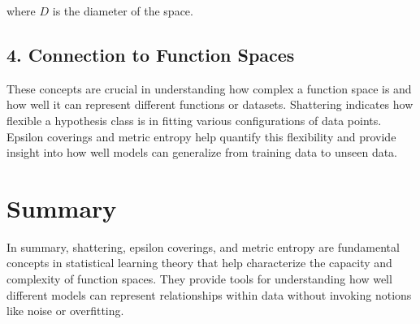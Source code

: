 \documentclass{article}
\begin{document}
where $D$ is the diameter of the space.

\subsection{4. Connection to Function Spaces}
These concepts are crucial in understanding how complex a function space is and how well it can represent different functions or datasets.
Shattering indicates how flexible a hypothesis class is in fitting various configurations of data points.
Epsilon coverings and metric entropy help quantify this flexibility and provide insight into how well models can generalize from training data to unseen data.

\section{Summary}
In summary, shattering, epsilon coverings, and metric entropy are fundamental concepts in statistical learning theory that help characterize the capacity and complexity of function spaces. They provide tools for understanding how well different models can represent relationships within data without invoking notions like noise or overfitting.
\end{document}
